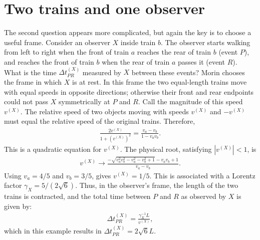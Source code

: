 \documentclass[12pt]{article}
\newcommand{\be}{\begin{eqnarray}}
\newcommand{\ee}{\end{eqnarray}}
\begin{document}
\section{Two trains and one observer}\label{sec:train2}
The second question appears more complicated, but again the key is to choose a useful frame. Consider an observer $X$ inside train $b$. The observer starts walking from left to right when the front of train $a$ reaches the rear of train $b$ (event $P$), and reaches the front of train $b$ when the rear of train $a$ passes it (event $R$). What is the time $\Delta t_{PR}^{(X)}$ measured by $X$ between these events? Morin chooses the frame in which $X$ is at rest. In this frame the two equal-length trains move with equal speeds in opposite directions; otherwise their front and rear endpoints could not pass $X$ symmetrically at $P$ and $R$. Call the magnitude of this speed $v^{(X)}$. The relative speed of two objects moving with speeds $v^{(X)}$ and $-v^{(X)}$ must equal the relative speed of the original trains. Therefore,
\be
\frac{2v^{(X)}}{1+(v^{(X)})^2} = \frac{v_a - v_b}{1-v_a v_b}.
\ee
This is a quadratic equation for $v^{(X)}$. The physical root, satisfying $|v^{(X)}|<1$, is
\be
v^{(X)}\to \frac{-\sqrt{v_a^2 v_b^2-v_a^2-v_b^2 +1}-v_av_b+1}{v_a-v_b}.
\ee
Using $v_a = 4/5$ and $v_b = 3/5$, gives $v^{(X)} = 1/5$. This is associated with a Lorentz factor $\gamma_X = 5/(2\sqrt{6})$. Thus, in the observer's frame, the length of the two trains is contracted, and the total time between $P$ and $R$ as observed by $X$ is given by:
\be
\Delta t_{PR}^{(X)} = \frac{\gamma_X^{-1} L}{v^{(X)}}, 
\ee
which in this example results in $\Delta t_{PR}^{(X)} = 2\sqrt{6} L$. \\
\end{document}
